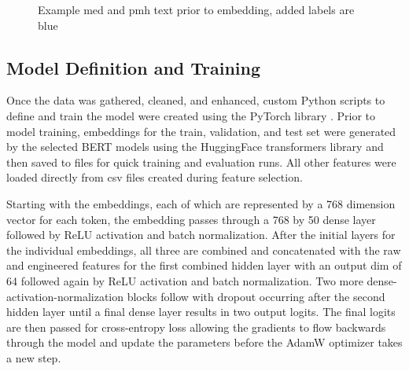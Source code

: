 \documentclass[sigconf]{acmart}
\begin{document}
\begin{figure}[t!]
    \centering
    \caption{Example med and pmh text prior to embedding, added labels are blue}
    \label{fig:pre-embed-example}
\end{figure}

\subsection{Model Definition and Training}
Once the data was gathered, cleaned, and enhanced, custom Python scripts to define and train the model were created using the PyTorch library \cite{paszke2019pytorch}. Prior to model training, embeddings for the train, validation, and test set were generated by the selected BERT models using the HuggingFace transformers library \cite{wolf2020transformers} and then saved to files for quick training and evaluation runs. All other features were loaded directly from csv files created during feature selection.

Starting with the embeddings, each of which are represented by a 768 dimension vector for each token, the embedding passes through a 768 by 50 dense layer followed by ReLU activation and batch normalization. After the initial layers for the individual embeddings, all three are combined and concatenated with the raw and engineered features for the first combined hidden layer with an output dim of 64 followed again by ReLU activation and batch normalization. Two more dense-activation-normalization blocks follow with dropout occurring after the second hidden layer until a final dense layer results in two output logits. The final logits are then passed for cross-entropy loss allowing the gradients to flow backwards through the model and update the parameters before the AdamW optimizer \cite{loshchilov2019decoupled} takes a new step. 
\end{document}
